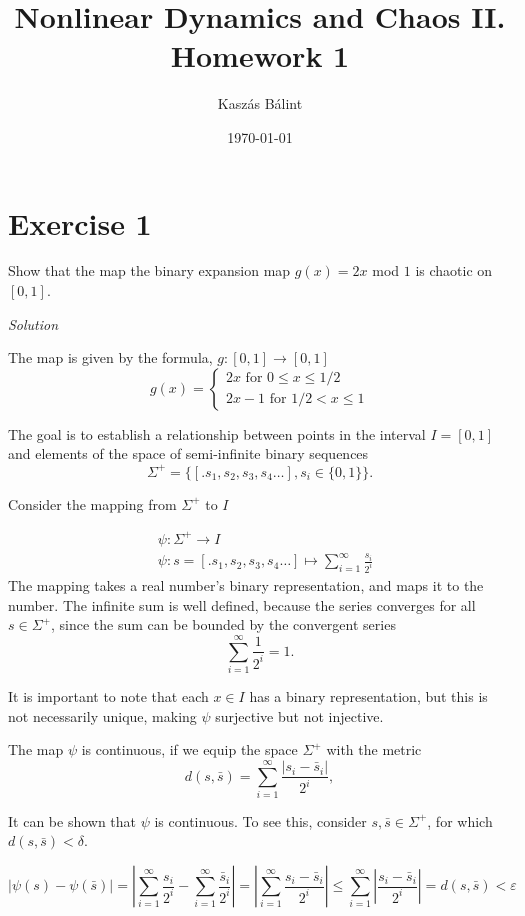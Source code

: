 \documentclass[a4paper,11pt,pdftex]{article}
\title{Nonlinear Dynamics and Chaos II. \\ Homework 1}
\author{Kaszás Bálint}
\date{\today}
\begin{document}
\pagestyle{fancy}

\maketitle


\section*{Exercise 1}
Show that the map the binary expansion map $g(x) = 2x$ mod $1$ is chaotic on $[0, 1]$.

\emph{Solution}

The map is given by the formula, $g : [0,1] \to [0,1]$
$$
g(x) = \begin{cases} 2x \text{ for } 0\leq x\leq 1/2 \\
2x-1 \text{ for } 1/2< x \leq 1
\end{cases}
$$

The goal is to establish a relationship between points in the interval $I=[0,1]$ and elements of the space of semi-infinite binary sequences
$$
\Sigma^+ = \{ [.s_1,s_2,s_3,s_4\dots ], s_i\in \{0,1\}\}.
$$

Consider the mapping from $\Sigma^+$ to $I$

\begin{align*}
    &\psi : \Sigma^+ \to I \\
    &\psi: s = [.s_1,s_2,s_3,s_4\dots ] \mapsto \sum_{i=1}^\infty \frac{s_i}{2^i}
\end{align*}
The mapping takes a real number's binary representation, and maps it to the number. The infinite sum is well defined, because the series converges for all $s\in \Sigma^+$, since the sum can be bounded by the convergent series 
$$
\sum_{i=1}^\infty \frac{1}{2^i} = 1. 
$$

It is important to note that each $x\in I$ has a binary representation, but this is not necessarily unique, making $\psi$ surjective but not injective. 

The map $\psi$ is continuous, if we equip the space $\Sigma^+$ with the metric
$$
d(s, \bar{s}) = \sum_{i=1}^\infty \frac{|s_i - \bar{s}_i|}{2^{i}},
$$

It can be shown that $\psi$ is continuous. To see this, consider $s, \bar{s} \in \Sigma^+$, for which $d(s, \bar{s})< \delta$. 

$$
|\psi(s) - \psi(\bar{s})| = \left\vert\sum_{i=1}^\infty \frac{s_i}{2^i} -\sum_{i=1}^\infty \frac{\bar{s}_i}{2^i}  \right \vert = \left \vert\sum_{i=1}^\infty \frac{s_i - \bar{s}_i}{2^i} \right \vert \leq \sum_{i=1}^\infty \left \vert \frac{s_i - \bar{s}_i}{2^i} \right \vert = d(s, \bar{s}) < \varepsilon 
$$
\end{document}
